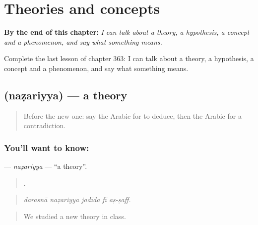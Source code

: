 
\chapter{Theories and concepts}
\label{ch:ar-theories-and-concepts}

\begin{chapteropening}
\textbf{By the end of this chapter:} \emph{I can talk about a theory, a hypothesis, a concept and a phenomenon, and say what something means.}

Complete the last lesson of chapter 363: I can talk about a theory, a hypothesis, a concept and a phenomenon, and say what something means.
\end{chapteropening}

\section[\texorpdfstring{\ar{نظرية} (naẓariyya)}{نظرية (naẓariyya)}]{ (naẓariyya) — a theory}

\label{lesson:AR-C363-nazariyya}



\begin{quote}
Before the new one: say the Arabic for to deduce, then the Arabic for a contradiction.
\end{quote}

\subsection*{You'll want to know: }
\textbf{} — \emph{naẓariyya} — \textquotedblleft{}a theory\textquotedblright{}.

\begin{quote}
    .
\end{quote}

\begin{quote}
\emph{darasnā naẓariyya jadīda fī aṣ-ṣaff.}
\end{quote}

\begin{quote}
We studied a new theory in class.
\end{quote}

